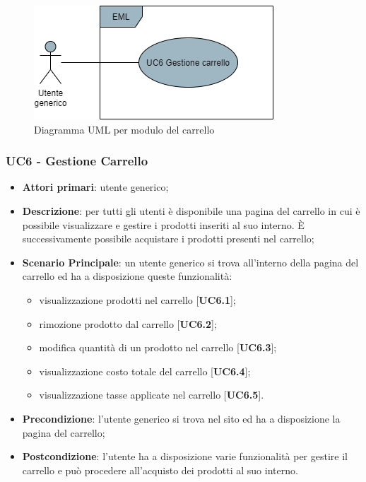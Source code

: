 \begin{figure}[H]
\centering
\includegraphics[scale=0.6]{res/UseCase/Immagini/CarrelloGenerale}
\caption{Diagramma UML per modulo del carrello}
\end{figure}

\subsubsection{UC6 - Gestione Carrello}
\begin{itemize}
\item \textbf{Attori primari}: utente generico;
\item \textbf{Descrizione}: per tutti gli utenti è disponibile una pagina del carrello in cui è possibile visualizzare e gestire i prodotti inseriti al suo interno. È successivamente possibile acquistare i prodotti presenti nel carrello;
\item \textbf{Scenario Principale}: un utente generico si trova all'interno della pagina del carrello ed ha a disposizione queste funzionalità:
\begin{itemize}
\item visualizzazione prodotti nel carrello [\textbf{UC6.1}];
\item rimozione prodotto dal carrello [\textbf{UC6.2}];
\item modifica quantità di un prodotto nel carrello [\textbf{UC6.3}];
\item visualizzazione costo totale del carrello [\textbf{UC6.4}];
\item visualizzazione tasse applicate nel carrello [\textbf{UC6.5}].
\end{itemize}
\item \textbf{Precondizione}: l'utente generico si trova nel sito ed ha a disposizione la pagina del carrello;
\item \textbf{Postcondizione}: l'utente ha a disposizione varie funzionalità per gestire il carrello e può procedere all'acquisto dei prodotti al suo interno.
\end{itemize}

